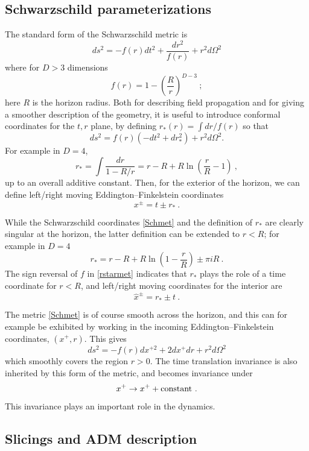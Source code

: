 \documentclass[12pt]{article}
\numberwithin{equation}{section}
\newcommand{\beq}{\begin{equation}}
\newcommand{\eeq}{\end{equation}}
\begin{document}
\subsection{Schwarzschild parameterizations} 
The standard form of the Schwarzschild metric is
\beq
\label{Schmet}
ds^2 = -f(r) dt^2 + \frac{dr^2}{f(r)} + r^2 d\Omega^2
\eeq
where for $D>3$ dimensions
\beq
f(r) = 1-\left(\frac{R}{r}\right)^{D-3}\ ;
\eeq
here $R$ is the horizon radius.  Both for describing field propagation and for giving a smoother description of the geometry, it
 is useful to introduce conformal coordinates for the $t,r$ plane, by defining $r_*(r) = \int dr/{f(r)}$ so that
\beq
\label{rstarmet}
ds^2 = f(r)(- dt^2 +dr_*^2) + r^2 d\Omega^2.
\eeq
For example in $D=4$, 
\beq
r_* = \int \frac{dr}{1-R/r} = r-R+R\ln\left(\frac{r}{R}-1\right)\ ,
\eeq
up to an overall additive constant.  
Then, for the exterior of the horizon, we can define left/right moving Eddington--Finkelstein coordinates 
\beq\label{xpdef}
x^\pm = t\pm r_*\ .
\eeq

While the Schwarzschild coordinates \eqref{Schmet} and the definition of $r_*$ are clearly singular at the horizon, the latter definition can be extended to $r<R$;  for example in $D=4$
\beq
r_* =   r-R+R\ln\left(1-\frac{r}{R}\right) \pm\pi i R\ .
\eeq
The sign reversal of $f$ in \eqref{rstarmet} indicates that $r_*$ plays the role of a time coordinate for $r<R$, and left/right moving coordinates for the interior are
\beq
{\hat x}^\pm = r_*\pm t\ .
\eeq

The metric \eqref{Schmet} is of course smooth across the horizon, and this can for example be exhibited by working in the incoming Eddington--Finkelstein coordinates, $(x^+,r)$.  This gives
\beq
\label{EFmet}
ds^2 = -f(r) dx^{+2} + 2dx^+ dr + r^2 d\Omega^2
\eeq
which smoothly covers the region $r>0$.  The time translation invariance is also inherited by this form of the metric, and becomes invariance under
\beq\label{ttrans}
x^+\rightarrow x^+ + {\rm constant}\ .
\eeq
This invariance plays an important role in the dynamics.

\subsection{Slicings and ADM description}
\label{Slicesec}
\end{document}
